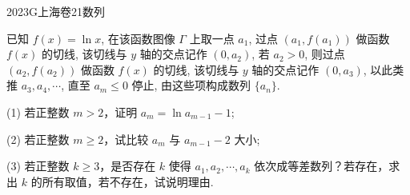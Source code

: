 
\begin{problem}{2023}{G}{上海卷}{21}{数列}

已知 $f(x)=\ln x$, 在该函数图像 $\Gamma$ 上取一点 $a_1$, 过点 $(a_1, f(a_1))$ 做函数 $f(x)$ 的切线, 该切线与 $y$ 轴的交点记作 $(0, a_2)$, 若 $a_2>0$, 则过点 $(a_2, f(a_2))$ 做函数 $f(x)$ 的切线, 该切线与 $y$ 轴的交点记作 $(0, a_3)$, 以此类推 $a_3, a_4, \cdots$, 直至 $a_m \le 0$ 停止, 由这些项构成数列 $\{a_n\}$.

(1) 若正整数 $m>2$，证明 $a_m=\ln a_{m-1}-1$;

(2) 若正整数 $m \geqslant 2$，试比较 $a_m$ 与 $a_{m-1}-2$ 大小;

(3) 若正整数 $k \geqslant 3$，是否存在 $k$ 使得 $a_1, a_2, \cdots, a_k$ 依次成等差数列？若存在，求出 $k$ 的所有取值，若不存在，试说明理由.

\end{problem}

